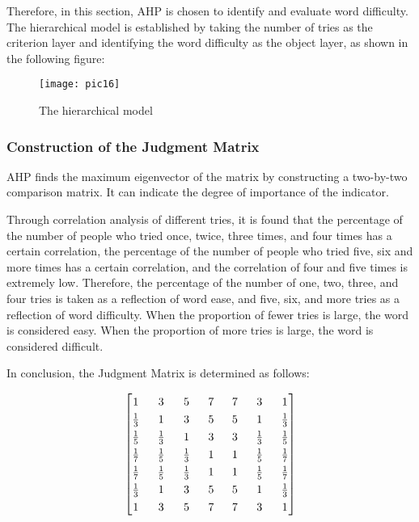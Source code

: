 \documentclass[12pt]{article}  %
\begin{document}
Therefore, in this section, AHP is chosen to identify and evaluate word difficulty. The hierarchical model is established by taking the number of tries as the criterion layer and identifying the word difficulty as the object layer, as shown in the following figure:

\begin{figure}[H]  %
	\centering  %
	\texttt{[image: pic16]} %
	\caption{The hierarchical model}  
	\label{pic16}
\end{figure}
\vspace{-1cm}

\subsubsection*{Construction of the Judgment Matrix}
AHP finds the maximum eigenvector of the matrix by constructing a two-by-two comparison matrix. It can indicate the degree of importance of the indicator.

Through correlation analysis of different tries, it is found that the percentage of the number of people who tried once, twice, three times, and four times has a certain correlation, the percentage of the number of people who tried five, six and more times has a certain correlation, and the correlation of four and five times is extremely low. Therefore, the percentage of the number of one, two, three, and four tries is taken as a reflection of word ease, and five, six, and more tries as a reflection of word difficulty. When the proportion of fewer tries is large, the word is considered easy. When the proportion of more tries is large, the word is considered difficult.

In conclusion, the Judgment Matrix is determined as follows:

\[
\renewcommand\arraystretch{1.3}
\setlength{\arraycolsep}{8pt} %
\begin{bmatrix}
	1 & 3 & 5 & 7 & 7 & 3 & 1 \\
	\frac{1}{3} & 1 & 3 & 5 & 5 & 1 & \frac{1}{3} \\
	\frac{1}{5} & \frac{1}{3} & 1 & 3 & 3 & \frac{1}{3} & \frac{1}{5} \\
	\frac{1}{7} & \frac{1}{5} & \frac{1}{3} & 1 & 1 & \frac{1}{5} & \frac{1}{7} \\
	\frac{1}{7} & \frac{1}{5} & \frac{1}{3} & 1 & 1 & \frac{1}{5} & \frac{1}{7} \\
	\frac{1}{3} & 1 & 3 & 5 & 5 & 1 & \frac{1}{3} \\
	1 & 3 & 5 & 7 & 7 & 3 & 1 \\
\end{bmatrix}
\renewcommand\arraystretch{1} %
\setlength{\arraycolsep}{6pt} %
\]
\end{document}
